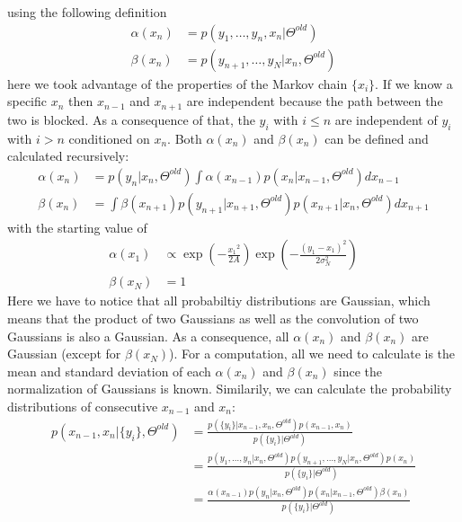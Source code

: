 \documentclass[%
 reprint,
 amsmath,amssymb,
 aps,
]{revtex4-1}
\begin{document}
using the following definition
\begin{equation}
	\begin{aligned}
	\alpha(x_{n})&=p(y_{1},\dots,y_{n},x_{n}|\Theta^{old})\\
	\beta(x_{n})&=p(y_{n+1},\dots,y_{N}|x_{n},\Theta^{old})
	\end{aligned}
\end{equation}
here we took advantage of the properties of the Markov chain $\{x_{i}\}$.  If we know a specific $x_{n}$ then $x_{n-1}$ and $x_{n+1}$ are independent because the path between the two is blocked.  As a consequence of that, the $y_{i}$ with $i\leq n$ are independent of $y_{i}$ with $i>n$ conditioned on $x_{n}$.  Both $\alpha(x_{n})$ and $\beta(x_{n})$ can be defined and calculated recursively:
\begin{equation}
	\begin{aligned}
	\alpha(x_{n})&=p(y_{n}|x_{n},\Theta^{old})\int \alpha(x_{n-1})p(x_{n}|x_{n-1},\Theta^{old})dx_{n-1}\\
	\beta(x_{n})&=\int \beta(x_{n+1})p(y_{n+1}|x_{n+1},\Theta^{old})p(x_{n+1}|x_{n},\Theta^{old})dx_{n+1}
	\end{aligned}
\end{equation}
with the starting value of
\begin{equation}
	\begin{aligned}
\alpha(x_{1})&\propto \exp \left( { - \frac{{x_1}^2}{2A}}\right)\exp \left( -\frac{{{{\left( {y_{1} - x_{1}} \right)}^2}}}{{2\sigma_{N}^{2}}} \right)\\
\beta(x_{N})&=1
	\end{aligned}
\end{equation}
Here we have to notice that all probabiltiy distributions are Gaussian, which means that the product of two Gaussians as well as the convolution of two Gaussians is also a Gaussian.  As a consequence, all $\alpha(x_{n})$ and $\beta(x_{n})$ are Gaussian (except for $\beta(x_{N})$).  For a computation, all we need to calculate is the mean and standard deviation of each $\alpha(x_{n})$ and $\beta(x_{n})$ since the normalization of Gaussians is known.  Similarily, we can calculate the probability distributions of consecutive $x_{n-1}$ and $x_{n}$:
\begin{equation}\label{margxnxnmone}
	\begin{aligned}
	p\left( x_{n-1},x_{n}|\{y_{i}\},\Theta^{old}\right)&=\frac{p\left( \{y_{i}\}|x_{n-1},x_{n},\Theta^{old}\right)p(x_{n-1},x_{n})}{p(\{y_{i}\}|\Theta^{old})}\\
	&=\frac{p(y_{1},\dots,y_{n}|x_{n},\Theta^{old})p(y_{n+1},\dots,y_{N}|x_{n},\Theta^{old})p(x_{n})}{p(\{y_{i}\}|\Theta^{old})}\\
	&=\frac{\alpha(x_{n-1})p(y_{n}|x_{n},\Theta^{old})p(x_{n}|x_{n-1},\Theta^{old})\beta(x_{n})}{p(\{y_{i}\}|\Theta^{old})}
	\end{aligned}
\end{equation}
\end{document}
